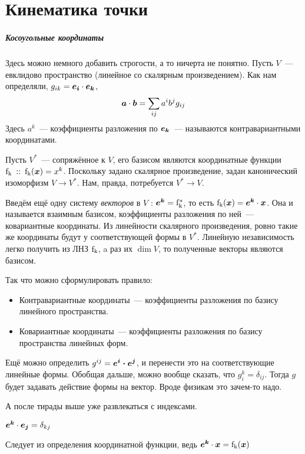 \documentclass[ebook]{longnotes}
\begin{document}
\chapter{Кинематика точки}

\setcounter{paragraph}{1}
\paragraph{Косоугольные координаты}

Здесь можно немного добавить строгости, а то ничерта не понятно.
Пусть $V$~--- евклидово пространство (линейное со скалярным произведением).
Как нам определяли, $g_{ik} = \v{e_i} \cdot \v{e_k}$,
\[
   \v a \cdot \v b  = \sum_{ij}  a^i b^j g_{ij}
\]
Здесь $a^k$~--- коэффициенты разложения по $\v{e_k}$~--- называются контравариантными координатами.

Пусть $V^*$~--- сопряжённое к $V$, его базисом являются координатные функции
$\v*{f_k} \that \v*{f_k}(\v x) = x^k$. 
Поскольку задано скалярное произведение, задан канонический изоморфизм $V \to V^*$.
Нам, правда, потребуется $V^* \to V$.

Введём ещё одну систему \emph{векторов} в $V$ : $\v{e^k} = \v*{f_k^*}$, то есть 
$\v*{f_k}(\v x) = \v{e^k} \cdot \v x$. 
Она и называется взаимным
базисом, коэффициенты разложения по ней~--- ковариантные координаты.
Из линейности скалярного произведения, ровно такие же координаты будут у соответствующей
формы в $V^*$.
Линейную независимость легко получить из ЛНЗ $\v*{f_k}$, a
раз их $\dim V$, то полученные векторы являются базисом.

Так что можно сформулировать правило:
\begin{itemize}
  \item Контравариантные координаты~--- коэффициенты разложения по базису линейного пространства.
  \item Ковариантные координаты~--- коэффициенты разложения по базису пространства линейных форм.
\end{itemize}
Ещё можно определить $g^{ij} = \v{e^i \cdot e^j}$, и перенести это на 
соответствующие линейные формы. Обобщая дальше, можно вообще сказать, что $g_i^k = \delta_{ij}$.
Тогда $g$ будет задавать действие формы на вектор. Вроде физикам это зачем-то надо.

А после тирады выше уже развлекаться с индексами.

\begin{prop}
  $\v{e^k} \cdot \v{e_j} = \delta_{kj}$
\end{prop}
\begin{lproof}
  Следует из определения координатной функции, ведь $\v{e^k} \cdot \v x = \v*{f_k}(\v x)$
\end{lproof}
\end{document}
